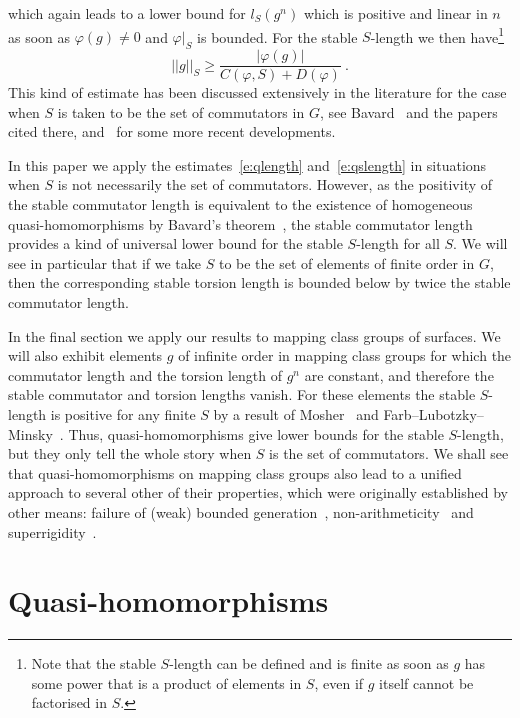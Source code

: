 \documentclass[12pt]{amsart}
\theoremstyle{remark}
\theoremstyle{definition}
\begin{document}
which again leads to a lower bound for $l_{S}(g^{n})$ which is positive 
and linear in $n$ as soon as $\varphi(g)\neq 0$ and $\varphi\vert_{S}$ 
is bounded. For the stable $S$-length we then have\footnote{Note that 
the stable $S$-length can be defined and is finite as soon as $g$ has 
some power that is a product of elements in $S$, even if $g$ itself cannot 
be factorised in $S$.}
\begin{equation}\label{e:qslength}
   \vert\vert g\vert\vert_{S}
    \geq\frac{\vert\varphi(g)\vert}{C(\varphi,S)+D(\varphi)} \ .
    \end{equation}
This kind of estimate has been discussed extensively in the 
literature for the case when $S$ is taken to be the set of commutators 
in $G$, see Bavard~\cite{B} and the papers cited there, 
and~\cite{BF,EK,PR} for some more recent developments.

In this paper we apply the estimates~\eqref{e:qlength} and~\eqref{e:qslength}
in situations when $S$ is not necessarily the set of commutators. However, 
as the positivity of the stable commutator length is equivalent to the 
existence of homogeneous quasi-homomorphisms by Bavard's theorem~\cite{B}, 
the stable commutator length provides a kind of universal lower bound for the 
stable $S$-length for all $S$. We will see in particular that if we take $S$ to 
be the set of elements of finite order in $G$, then the corresponding stable 
torsion length is bounded below by twice the stable commutator length.

In the final section we apply our results to mapping class groups of 
surfaces. We will also exhibit elements $g$ of infinite order in 
mapping class groups for which the commutator length and the torsion length 
of $g^{n}$ are constant, and therefore the stable commutator and 
torsion lengths vanish. For these elements the stable $S$-length is positive 
for any finite $S$ by a result of Mosher~\cite{Mosher} and 
Farb--Lubotzky--Minsky~\cite{FLM}. Thus, quasi-homomorphisms give lower bounds 
for the stable $S$-length, but they only tell the whole story when $S$ is the 
set of commutators. We shall see that quasi-homomorphisms on mapping 
class groups also lead to a unified approach to several other of their 
properties, which were originally established by other means: failure 
of (weak) bounded generation~\cite{FLM}, non-arithmeticity~\cite{I} 
and superrigidity~\cite{FM,KM}.

\section{Quasi-homomorphisms}\label{s:qmorph}
\end{document}
